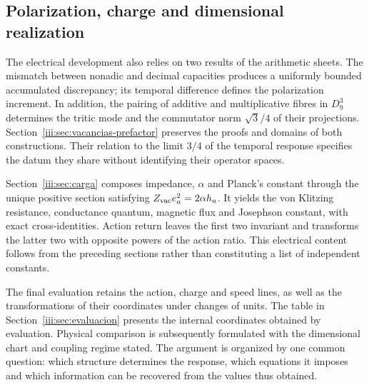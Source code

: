 \subsection{Polarization, charge and dimensional realization}

The electrical development also relies on two results of the
arithmetic sheets. The mismatch between nonadic and decimal capacities
produces a uniformly bounded accumulated discrepancy; its temporal
difference defines the polarization increment. In addition, the
pairing of additive and multiplicative fibres in $D_9^3$ determines
the tritic mode and the commutator norm $\sqrt3/4$ of their
projections. Section~\ref{iii:sec:vacancias-prefactor} preserves
the proofs and domains of both constructions. Their relation to the
limit $3/4$ of the temporal response specifies the datum they share
without identifying their operator spaces.

Section~\ref{iii:sec:carga} composes impedance, $\alpha$ and
Planck's constant through the unique positive section satisfying
$Z_{\rm vac}e_a^2=2\alpha h_a$. It yields the von Klitzing
resistance, conductance quantum, magnetic flux and Josephson constant,
with exact cross-identities. Action return leaves the first two
invariant and transforms the latter two with opposite powers of the
action ratio. This electrical content follows from the preceding
sections rather than constituting a list of independent constants.

The final evaluation retains the action, charge and speed lines,
as well as the transformations of their coordinates under changes
of units. The table in Section~\ref{iii:sec:evaluacion} presents
the internal coordinates obtained by evaluation. Physical comparison is subsequently formulated
with the dimensional chart and coupling regime stated. The argument
is organized by one common question: which structure determines the
response, which equations it imposes and which information can be
recovered from the values thus obtained.
